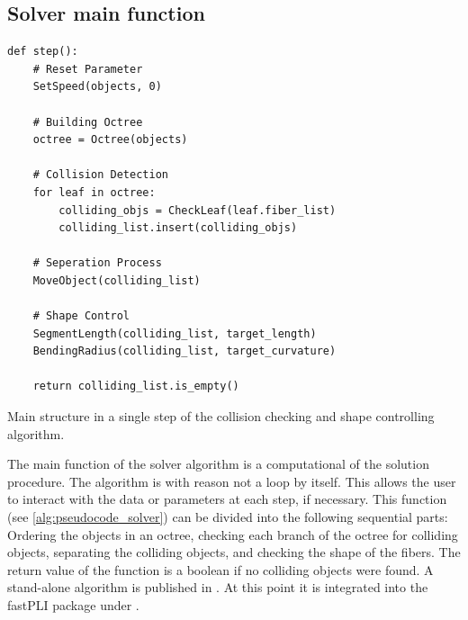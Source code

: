 \subsection{Solver main function}
%
\begin{lstfloat}[!tb]
\lstset{style=python}
\begin{lstlisting}[]
def step():
    # Reset Parameter
    SetSpeed(objects, 0)
   
    # Building Octree
    octree = Octree(objects)
   
    # Collision Detection
    for leaf in octree:
        colliding_objs = CheckLeaf(leaf.fiber_list)
        colliding_list.insert(colliding_objs)

    # Seperation Process
    MoveObject(colliding_list)

    # Shape Control
    SegmentLength(colliding_list, target_length)
    BendingRadius(colliding_list, target_curvature)

    return colliding_list.is_empty()
\end{lstlisting}
\caption{Main structure in a single step of the collision checking and shape controlling algorithm.}
\label{alg:pseudocode_solver}
\end{lstfloat}
%
The main function of the solver algorithm is a computational  of the solution procedure.
The algorithm is with reason not a loop by itself.
This allows the user to interact with the data or parameters at each step, if necessary.
This  function (see \cref{alg:pseudocode_solver}) can be divided into the following sequential parts:
Ordering the objects in an octree, checking each branch of the octree for colliding objects, separating the colliding objects, and checking the shape of the fibers.
The return value of the function is a boolean if no colliding objects were found.
A stand-alone algorithm is published in \cite{Matuschke2019}.
At this point it is integrated into the \ac{fastPLI} package under .
%
%
%

